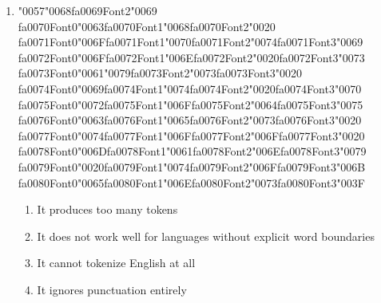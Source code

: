 \documentclass[12pt]{article}
\begin{document}
\begin{enumerate}[label=Q\arabic*.]
\item {\char"0057}{\char"0068}{\csname fa0069Font2\endcsname\char"0069} {\csname fa0070Font0\endcsname\char"0063}{\csname fa0070Font1\endcsname\char"0068}{\csname fa0070Font2\endcsname\char"0020} {\csname fa0071Font0\endcsname\char"006F}{\csname fa0071Font1\endcsname\char"0070}{\csname fa0071Font2\endcsname\char"0074}{\csname fa0071Font3\endcsname\char"0069} {\csname fa0072Font0\endcsname\char"006F}{\csname fa0072Font1\endcsname\char"006E}{\csname fa0072Font2\endcsname\char"0020}{\csname fa0072Font3\endcsname\char"0073} {\csname fa0073Font0\endcsname\char"0061}{\char"0079}{\csname fa0073Font2\endcsname\char"0073}{\csname fa0073Font3\endcsname\char"0020} {\csname fa0074Font0\endcsname\char"0069}{\csname fa0074Font1\endcsname\char"0074}{\csname fa0074Font2\endcsname\char"0020}{\csname fa0074Font3\endcsname\char"0070} {\csname fa0075Font0\endcsname\char"0072}{\csname fa0075Font1\endcsname\char"006F}{\csname fa0075Font2\endcsname\char"0064}{\csname fa0075Font3\endcsname\char"0075} {\csname fa0076Font0\endcsname\char"0063}{\csname fa0076Font1\endcsname\char"0065}{\csname fa0076Font2\endcsname\char"0073}{\csname fa0076Font3\endcsname\char"0020} {\csname fa0077Font0\endcsname\char"0074}{\csname fa0077Font1\endcsname\char"006F}{\csname fa0077Font2\endcsname\char"006F}{\csname fa0077Font3\endcsname\char"0020} {\csname fa0078Font0\endcsname\char"006D}{\csname fa0078Font1\endcsname\char"0061}{\csname fa0078Font2\endcsname\char"006E}{\csname fa0078Font3\endcsname\char"0079} {\csname fa0079Font0\endcsname\char"0020}{\csname fa0079Font1\endcsname\char"0074}{\csname fa0079Font2\endcsname\char"006F}{\csname fa0079Font3\endcsname\char"006B} {\csname fa0080Font0\endcsname\char"0065}{\csname fa0080Font1\endcsname\char"006E}{\csname fa0080Font2\endcsname\char"0073}{\csname fa0080Font3\endcsname\char"003F}
\begin{enumerate}[label=(\Alph*)]
    \item It produces too many tokens
    \item It does not work well for languages without explicit word boundaries
    \item It cannot tokenize English at all
    \item It ignores punctuation entirely
\end{enumerate}

\end{enumerate}
\end{document}
